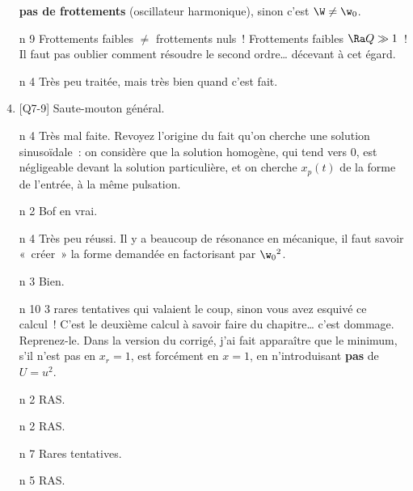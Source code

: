 \documentclass[a4paper, 10pt, final, garamond]{book}
\begin{document}
\begin{enumerate}
	      \textbf{pas de frottements} (oscillateur harmonique), sinon c'est $\W
		      \neq \w_0$.
	\item[n]{9} %
	      Frottements faibles $\neq$ frottements nuls~! Frottements faibles $\Ra Q
		      \gg 1$~! Il faut pas oublier comment résoudre le second ordre… décevant
	      à cet égard.
	\item[n]{4} %
	      Très peu traitée, mais très bien quand c'est fait.
	\item{}[Q7-9] %
	      Saute-mouton général.
	      \setcounter{enumi}{9}
	\item[n]{4} %
	      Très mal faite. Revoyez l'origine du fait qu'on cherche une solution
	      sinusoïdale~: on considère que la solution homogène, qui tend vers 0,
	      est négligeable devant la solution particulière, et on cherche $x_p(t)$
	      de la forme de l'entrée, à la même pulsation.
	\item[n]{2} %
	      Bof en vrai.
	\item[n]{4} %
	      Très peu réussi. Il y a beaucoup de résonance en mécanique, il faut
	      savoir
	      «~créer~» la forme demandée en factorisant par $\w_0{}^2$.
	\item[n]{3} %
	      Bien.
	\item[n]{10} %
	      3 rares tentatives qui valaient le coup, sinon vous avez esquivé ce
	      calcul~! C'est le deuxième calcul à savoir faire du chapitre… c'est
	      dommage. Reprenez-le. Dans la version du corrigé, j'ai fait apparaître
	      que le minimum, s'il n'est pas en $x_r = 1$, est forcément en $x = 1$,
	      en
	      n'introduisant \textbf{pas} de $U = u^2$.
	\item[n]{2} %
	      RAS.
	\item[n]{2} %
	      RAS.
	\item[n]{7} %
	      Rares tentatives.
	\item[n]{5} %
	      RAS.
\end{enumerate}
\end{document}
